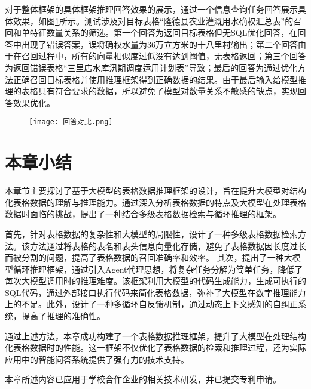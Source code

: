 对于整体框架的具体框架推理回答效果的展示，通过一个信息查询任务回答展示具体效果，如图\ref{fig:4-9}所示。测试涉及对目标表格“隆德县农业灌溉用水确权汇总表”的召回和单特征数量关系的筛选。第一个回答为返回目标表格但无SQL优化回答，在回答中出现了错误答案，误将确权水量为36万立方米的十八里村输出；第二个回答由于在召回过程中，所有的向量相似度过低没有达到阈值，无表格返回；第三个回答为返回错误表格“三里店水库汛期调度运用计划表”导致；最后的回答为通过优化方法正确召回目标表格并使用推理框架得到正确数据的结果。由于最后输入给模型推理的表格只有符合要求的数据，所以避免了模型对数量关系不敏感的缺点，实现回答效果优化。
\begin{figure}[hb]
    \centering
    \texttt{[image: 回答对比.png]}
    \label{fig:4-9}
\end{figure}
\section{本章小结}
本章节主要探讨了基于大模型的表格数据推理框架的设计，旨在提升大模型对结构化表格数据的理解与推理能力。通过深入分析表格数据的特点及大模型在处理表格数据时面临的挑战，提出了一种结合多级表格数据检索与循环推理的框架。

首先，针对表格数据的复杂性和大模型的局限性，设计了一种多级表格数据检索方法。该方法通过将表格的表名和表头信息向量化存储，避免了表格数据因长度过长而被分割的问题，提高了表格数据的召回准确率和效率。
其次，提出了一种大模型循环推理框架，通过引入Agent代理思想，将复杂任务分解为简单任务，降低了每次大模型调用时的推理难度。该框架利用大模型的代码生成能力，生成可执行的SQL代码，通过外部接口执行代码来简化表格数据，弥补了大模型在数字推理能力上的不足。此外，设计了一种多循环自反馈机制，通过动态上下文感知的自纠正系统，提高了推理的准确性。

通过上述方法，本章成功构建了一个表格数据推理框架，提升了大模型在处理结构化表格数据时的性能。这一框架不仅优化了表格数据的检索和推理过程，还为实际应用中的智能问答系统提供了强有力的技术支持。

本章所述内容已应用于学校合作企业的相关技术研发，并已提交专利申请。
